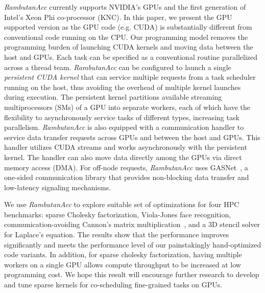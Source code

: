 {\em RambutanAcc} currently supports NVIDIA's GPUs and the first generation of Intel's Xeon Phi co-processor (KNC).
In this paper, we present the GPU supported version as the GPU code (e.g. CUDA) is substantially different from conventional code running on the CPU.
Our programming model removes the programming burden of launching CUDA kernels and moving data between the host and GPUs.
Each task can be specified as a conventional routine parallelized across a thread team.
{\em RambutanAcc} can be configured to launch a single {\em persistent CUDA kernel} that can service multiple requests from a task scheduler running on the host, thus avoiding the overhead of multiple kernel launches during execution.
The persistent kernel partitions available streaming multiprocessors (SMs) of a GPU into separate workers, each of which have the flexibility to asynchronously service tasks of different types, increasing task parallelism.
{\em RambutanAcc} is also equipped with a communication handler to service data transfer requests across GPUs and between the host and GPUs.
This handler utilizes CUDA streams and works asynchronously with the persistent kernel.
The handler can also move data directly among the GPUs via direct memory access (DMA).
For off-node requests, {\em RambutanAcc} uses GASNet~\cite{Bonachea:2002:gasnet}, a one-sided communication library %
that provides non-blocking data transfer and low-latency signaling mechanisms. %

We use {\em RambutanAcc} to explore suitable set of optimizations for four HPC benchmarks: sparse Cholesky factorization, Viola-Jones face recognition, communication-avoiding Cannon's matrix multiplication~\cite{25Dcannon}, and a 3D stencil solver for Laplace's equation.
The results show that the performance improves significantly and meets the performance level of our painstakingly hand-optimized code variants.
In addition, for sparse cholesky factorization, having multiple workers on a single GPU allows compute throughput to be increased at low programming cost. 
We hope this result will encourage further research to develop and tune sparse kernels for co-scheduling fine-grained tasks on GPUs.

